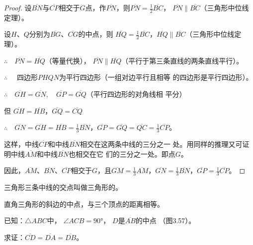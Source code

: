 \begin{proof}
设$\overline{BN}$与$\overline{CP}$相交于$G$点，作$\overline{PN}$，则$\overline{PN}=\frac{1}{2}\overline{BC}$，
$\overline{PN}\parallel \overline{BC}$（三角形中位线定理）。

设$H$、$Q$分别为$\overline{BG}$、$\overline{CG}$的中点，则
$\overline{HQ}=\frac{1}{2}\overline{BC}$，$\overline{HQ}\parallel\overline{BC}$（三角形中位线定理）。

$\therefore\quad \overline{PN}=\overline{HQ}$（等量代换），
$\overline{PN}\parallel \overline{HQ}$（平行于第三条直线的两条直线平行）。

$\therefore\quad$ 四边形$PHQN$为平行四边形（一组对边平行且相等
的四边形是平行四边形）。

$\therefore\quad \overline{GH}=\overline{GN},\quad \overline{GP}=\overline{GQ}$（平行四边形的对角线相
平分）

但 $\overline{GH}=\overline{HB}$，$\overline{GQ}=\overline{CQ}$

$\therefore\quad \overline{GN}=\overline{GH}=\overline{HB}=\frac{1}{3}\overline{BN}$，$\overline{GP}=\overline{GQ}=\overline{QC}=\frac{1}{3}\overline{CP}$。

这样，中线$\overline{CP}$和中线$\overline{BN}$相交在这两条中线的三分之一
处。用同样的推理又可证明中线$\overline{AM}$和中线$\overline{BN}$也相交在它
们的三分之一处。即点$G$。

因此，$\overline{AM}$、$\overline{BN}$、$\overline{CP}$相交于$G$，且$\overline{GM}=\frac{1}{3}\overline{AM}$，$\overline{GN}=\frac{1}{3}\overline{BN}$，$\overline{GP}=\frac{1}{3}\overline{CP}$。
\end{proof}

\begin{Definition}
三角形三条中线的交点叫做三角形的。
\end{Definition}

\begin{example}
    直角三角形的斜边的中点，与三个顶点的距离相等。
\end{example}
    
已知：$\triangle ABC$中，
$\angle ACB=\ang{90}$，
$D$是$\overline{AB}$的中点
（图3.57）。

求证：$\overline{CD}=\overline{DA}=\overline{DB}$。

